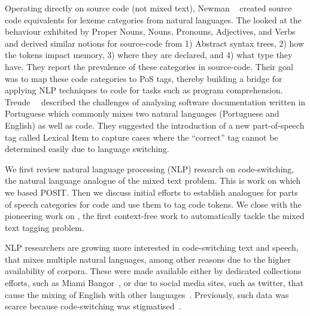 Operating directly on source code (not mixed text), Newman
\etal~\cite{Newman2017} created source code equivalents for lexeme categories
from natural languages. The looked at the behaviour exhibited by Proper Nouns,
Nouns, Pronouns, Adjectives, and Verbs and derived similar notions for
source-code from 1) Abstract syntax trees, 2) how the tokens impact memory, 3)
where they are declared, and 4) what type they have. They report the prevalence
of these categories in source-code. Their goal was to map these code categories
to PoS tags, thereby building a bridge for applying NLP techniques to code for
tasks such as program comprehension. Treude~\etal~\cite{Treude2015portuguese}
described the challenges of analysing software documentation written in
Portuguese which commonly mixes two natural languages (Portuguese and English)
as well as code. They suggested the introduction of a new part-of-speech tag
called Lexical Item to capture cases where the ``correct'' tag cannot be
determined easily due to language switching.

We first review natural language processing (NLP) research on code-switching,
the natural language analogue of the mixed text problem.  This is work on which
we based POSIT.  Then we discuss initial efforts to establish analogues for
parts of speech categories for code and use them to tag code tokens.  We close
with the pioneering work on \stormed, the first context-free work to
automatically tackle the mixed text tagging problem.

NLP researchers are growing more interested in code-switching text and speech,
\ie that mixes multiple natural languages, among other reasons due to the higher
availability of corpora. These were made available either by dedicated
collections efforts, such as Miami Bangor~\cite{bangorTalk}, or due to social
media sites, such as twitter, that cause the mixing of English with other
languages~\cite{Vyas2014}. Previously, such data was scarce because
code-switching was stigmatised~\cite{Poplack1980}. 

